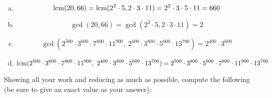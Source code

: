 \documentclass[12pt,letterpaper]{exam}
\begin{document}
\begin{questions}
 \pspace

\sol
\begin{enumerate}[(a)]
\item 
	\[
	\operatorname{lcm}(20, 66)= \operatorname{lcm}(2^2 \cdot 5, 2 \cdot 3 \cdot 11)= 2^2 \cdot 3 \cdot 5 \cdot 11= 660
	\] \pspace

\item 
	\[
	\gcd(20, 66)= \gcd(2^2 \cdot 5, 2 \cdot 3 \cdot 11)= 2
	\] \pspace

\item 
	\[
	\gcd(2^{500} \cdot 3^{600} \cdot 7^{800} \cdot 11^{900},\ 2^{400} \cdot 3^{800} \cdot 5^{600} \cdot 13^{700})= 2^{400} \cdot 3^{600} 
	\] \pspace

\item 
	\[
	\operatorname{lcm}(2^{500} \cdot 3^{600} \cdot 7^{800} \cdot 11^{900},\ 2^{400} \cdot 3^{800} \cdot 5^{600} \cdot 13^{700})= 2^{500} \cdot 3^{800} \cdot 5^{600} \cdot 7^{800} \cdot 11^{900} \cdot 13^{700}
	\]
\end{enumerate}



\newpage
\question Showing all your work and reducing as much as possible, compute the following (be sure to give an exact value as your answer):
	 \pspace


\end{questions}
\end{document}
